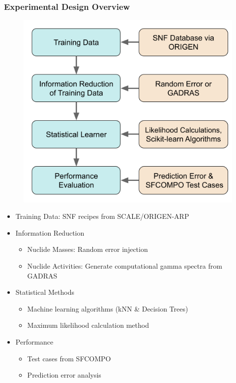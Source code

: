 \begin{frame}
  \frametitle{Experimental Design Overview}
  \begin{adjustwidth}{-15pt}{0pt}
  \begin{minipage}{0.45\textwidth}
    \begin{figure}
      \centering
      \includegraphics[width=\textwidth]{./figures/methodology.png}
    \end{figure}
  \end{minipage}%
  \hfill
  \begin{minipage}{0.55\textwidth}
    \begin{itemize}
      \item Training Data: SNF recipes from SCALE/ORIGEN-ARP \cite{scale, origen}
      \item Information Reduction
        \begin{itemize}
          \item Nuclide Masses: Random error injection
          \item Nuclide Activities: Generate computational gamma spectra from GADRAS \cite{gadras}
        \end{itemize}
      \item Statistical Methods
        \begin{itemize}
          \item Machine learning algorithms (kNN \& Decision Trees) \cite{scikit}
          \item Maximum likelihood calculation method \cite{mll_method, mll_sensitivity}
        \end{itemize}
      \item Performance
        \begin{itemize}
          \item Test cases from SFCOMPO \cite{sfcompo}
          \item Prediction error analysis
        \end{itemize}
    \end{itemize}
  \end{minipage}
  \end{adjustwidth}
\end{frame}


